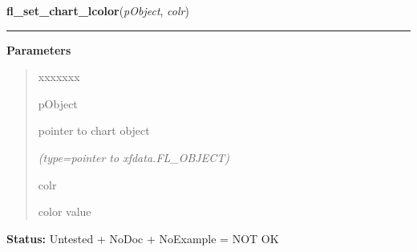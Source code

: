     \label{xformslib:library:fl_set_chart_lcolor}

    \vspace{0.5ex}

\hspace{.8\funcindent}\begin{boxedminipage}{\funcwidth}

    \raggedright \textbf{fl\_set\_chart\_lcolor}(\textit{pObject}, \textit{colr})

    \vspace{-1.5ex}

    \rule{\textwidth}{0.5\fboxrule}
\setlength{\parskip}{2ex}
\setlength{\parskip}{1ex}
      \textbf{Parameters}
      \vspace{-1ex}

      \begin{quote}
        \begin{Ventry}{xxxxxxx}

          \item[pObject]

          pointer to chart object

            {\it (type=pointer to xfdata.FL\_OBJECT)}

          \item[colr]

          color value

        \end{Ventry}

      \end{quote}

\textbf{Status:} Untested + NoDoc + NoExample = NOT OK



    \end{boxedminipage}

    \label{xformslib:library:fl_set_chart_baseline}

    \vspace{0.5ex}

